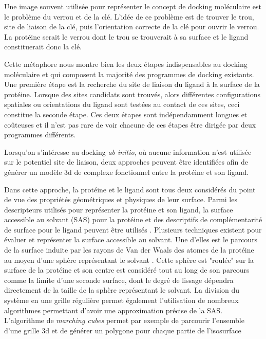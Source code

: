 Une image souvent utilisée pour représenter le concept de docking moléculaire est le problème du verrou et de la clé. L'idée de ce problème est de trouver le trou, site de liaison de la clé, puis l'orientation correcte de la clé pour ouvrir le verrou. La protéine serait le verrou dont le trou se trouverait à sa surface et le ligand constituerait donc la clé.

Cette métaphore nous montre bien les deux étapes indispensables au docking moléculaire et qui composent la majorité des programmes de docking existants. Une première étape est la recherche du site de liaison du ligand à la surface de la protéine. Lorsque des sites candidats sont trouvés, alors différentes configurations spatiales ou orientations du ligand sont testées au contact de ces sites, ceci constitue la seconde étape. Ces deux étapes sont indépendamment longues et coûteuses et il n'est pas rare de voir chacune de ces étapes être dirigée par deux programmes différents.

Lorsqu'on s'intéresse au docking \textit{ab initio}, où aucune information n'est utilisée sur le potentiel site de liaison, deux approches peuvent être identifiées afin de générer un modèle 3d de complexe fonctionnel entre la protéine et son ligand.


Dans cette approche, la protéine et le ligand sont tous deux considérés du point de vue des propriétés géométriques et physiques de leur surface. Parmi les descripteurs utilisés pour représenter la protéine et son ligand, la surface accessible au solvant (SAS) pour la protéine et des descriptifs de complémentarité de surface pour le ligand peuvent être utilisés \cite{shoichet1992molecular}. Plusieurs techniques existent pour évaluer et représenter la surface accessible au solvant. Une d'elles est le parcours de la surface induite par les rayons de Van der Waals des atomes de la protéine au moyen d'une sphère représentant le solvant \cite{connolly1983analytical}. Cette sphère est "roulée" sur la surface de la protéine et son centre est considéré tout au long de son parcours comme la limite d'une seconde surface, dont le degré de lissage dépendra directement de la taille de la sphère représentant le solvant. La division du système en une grille régulière permet également l'utilisation de nombreux algorithmes permettant d'avoir une approximation précise de la SAS. L'algorithme de \textit{marching cubes} permet par exemple de parcourir l'ensemble d'une grille 3d et de générer un polygone pour chaque partie de l'isosurface 

